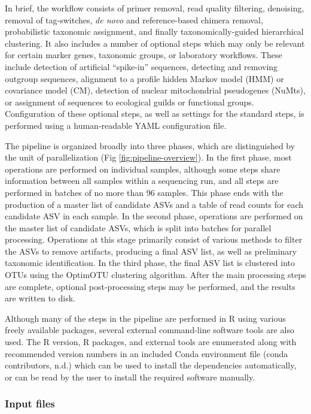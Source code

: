\documentclass[
]{article}
\begin{document}
In brief, the workflow consists of primer removal, read quality filtering, denoising, removal of tag-switches, \emph{de novo} and reference-based chimera removal, probabilistic taxonomic assignment, and finally taxonomically-guided hierarchical clustering.
It also includes a number of optional steps which may only be relevant for certain marker genes, taxonomic groups, or laboratory workflows.
These include detection of artificial ``spike-in'' sequences, detecting and removing outgroup sequences, alignment to a profile hidden Markov model (HMM) or covariance model (CM), detection of nuclear mitochondrial pseudogenes (NuMts), or assignment of sequences to ecological guilds or functional groups.
Configuration of these optional steps, as well as settings for the standard steps, is performed using a human-readable YAML configuration file.

The pipeline is organized broadly into three phases, which are distinguished by the unit of parallelization (Fig \ref{fig:pipeline-overview}).
In the first phase, most operations are performed on individual samples, although some steps share information between all samples within a sequencing run, and all steps are performed in batches of no more than 96 samples.
This phase ends with the production of a master list of candidate ASVs and a table of read counts for each candidate ASV in each sample.
In the second phase, operations are performed on the master list of candidate ASVs, which is split into batches for parallel processing.
Operations at this stage primarily consist of various methods to filter the ASVs to remove artifacts, producing a final ASV list, as well as preliminary taxonomic identification.
In the third phase, the final ASV list is clustered into OTUs using the OptimOTU clustering algorithm.
After the main processing steps are complete, optional post-processing steps may be performed, and the results are written to disk.

Although many of the steps in the pipeline are performed in R using various freely available packages, several external command-line software tools are also used.
The R version, R packages, and external tools are enumerated along with recommended version numbers in an included Conda environment file (conda contributors, n.d.) which can be used to install the dependencies automatically, or can be read by the user to install the required software manually.

\subsubsection{Input files}\label{input-files}
\end{document}
